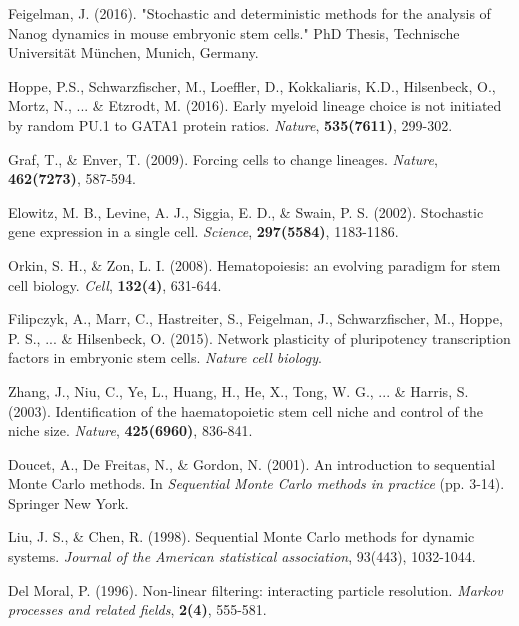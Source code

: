 \documentclass{bioinfo}
\begin{document}
\begin{thebibliography}{}

Feigelman, J. (2016). "Stochastic and deterministic methods for the analysis of Nanog dynamics in mouse embryonic stem cells." PhD Thesis, Technische Universit\"at M\"unchen, Munich, Germany.\vspace*{-2pt}

Hoppe, P.S., Schwarzfischer, M., Loeffler, D.,  Kokkaliaris, K.D., Hilsenbeck, O., Mortz, N., ... \& Etzrodt, M. (2016). Early myeloid lineage choice is not initiated by random PU.1 to GATA1 protein ratios. \textit{Nature}, \textbf{535(7611)}, 299-302.

Graf, T., \& Enver, T. (2009). Forcing cells to change lineages. \textit{Nature}, \textbf{462(7273)}, 587-594.

Elowitz, M. B., Levine, A. J., Siggia, E. D., \& Swain, P. S. (2002). Stochastic gene expression in a single cell. \textit{Science}, \textbf{297(5584)}, 1183-1186.

Orkin, S. H., \& Zon, L. I. (2008). Hematopoiesis: an evolving paradigm for stem cell biology. \textit{Cell}, \textbf{132(4)}, 631-644.

Filipczyk, A., Marr, C., Hastreiter, S., Feigelman, J., Schwarzfischer, M., Hoppe, P. S., ... \& Hilsenbeck, O. (2015). Network plasticity of pluripotency transcription factors in embryonic stem cells. \textit{Nature cell biology}.

Zhang, J., Niu, C., Ye, L., Huang, H., He, X., Tong, W. G., ... \& Harris, S. (2003). Identification of the haematopoietic stem cell niche and control of the niche size. \textit{Nature}, \textbf{425(6960)}, 836-841.

Doucet, A., De Freitas, N., \& Gordon, N. (2001). An introduction to sequential Monte Carlo methods. In \textit{Sequential Monte Carlo methods in practice} (pp. 3-14). Springer New York.

Liu, J. S., \& Chen, R. (1998). Sequential Monte Carlo methods for dynamic systems. \textit{Journal of the American statistical association}, 93(443), 1032-1044.

Del Moral, P. (1996). Non-linear filtering: interacting particle resolution. \textit{Markov processes and related fields}, \textbf{2(4)}, 555-581.


\end{thebibliography}
\end{document}
